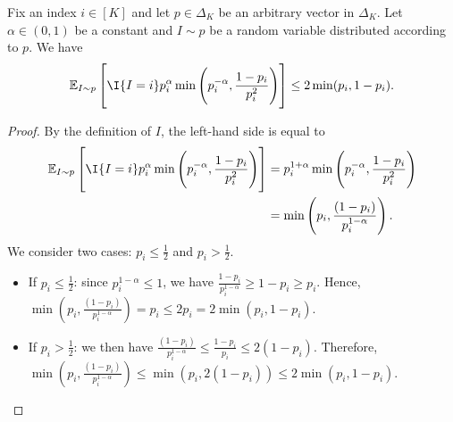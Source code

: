 \begin{lemma}
    Fix an index $i \in [K]$ and let $p \in \Delta_K$ be an arbitrary vector in $\Delta_K$. Let $\alpha \in (0,1)$ be a constant and $I \sim p$ be a random variable distributed according to $p$. We have
    \begin{align*}
        \E_{I \sim p}\left[\I{I = i}p_i^\alpha \min\left( p_i^{-\alpha}, \frac{1-p_i}{p_i^2} \right)\right] \leq 2\min(p_i, 1-p_i).
    \end{align*}
    \label{lemma:CoordinateWiseSPMztiIsGoodForStochasticBandits}
\end{lemma}
\begin{proof}
    By the definition of $I$, the left-hand side is equal to
    \begin{align*}
        \E_{I \sim p}\left[\I{I = i}p_i^\alpha \min\left( p_i^{-\alpha}, \frac{1-p_i}{p_i^2} \right)\right] &= p_i^{1+\alpha} \min\left( p_i^{-\alpha}, \frac{1-p_i}{p_i^2} \right) \\
        &= \min\left(p_i, \frac{(1-p_i)}{p_i^{1-\alpha}}\right).
    \end{align*}
    We consider two cases: $p_i \leq \frac{1}{2}$ and $p_i > \frac{1}{2}$.
    \begin{itemize}
        \item If $p_i \leq \frac{1}{2}$: since $p_i^{1-\alpha} \leq 1$, we have $\frac{1-p_i}{p_i^{1-\alpha}} \geq 1-p_i \geq p_i$. Hence, $\min\left(p_i, \frac{(1-p_i)}{p_i^{1-\alpha}}\right) = p_i \leq 2p_i = 2\min(p_i, 1-p_i)$.
        \item If $p_i > \frac{1}{2}$: we then have $\frac{(1-p_i)}{p_i^{1-\alpha}} \leq \frac{1-p_i}{p_i} \leq 2(1-p_i)$. Therefore, $\min\left(p_i, \frac{(1-p_i)}{p_i^{1-\alpha}}\right) \leq \min(p_i, 2(1-p_i)) \leq 2\min(p_i, 1-p_i)$.
    \end{itemize}
\end{proof}

